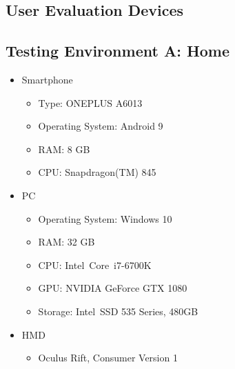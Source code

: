
\begin{appendices}
  \chapter{User Evaluation Devices}\label{chapter:append-user-eval-devices}
  \section{Testing Environment A: Home}
  \begin{itemize}
    \item Smartphone
    \begin{itemize}
      \item Type: ONEPLUS A6013
      \item Operating System: Android 9
      \item RAM: 8 GB
      \item CPU: Snapdragon(TM) 845 %
    \end{itemize}
    \item \ac{PC}
    \begin{itemize}
      \item Operating System: Windows 10
      \item RAM: 32 GB
      \item CPU: Intel\textregistered\ Core\texttrademark\ i7-6700K %
      \item GPU: NVIDIA GeForce GTX 1080
      \item Storage: Intel\textregistered\ SSD 535 Series, 480GB
    \end{itemize}
    \item \ac{HMD}
    \begin{itemize}
      \item Oculus Rift, Consumer Version 1
    \end{itemize}
  \end{itemize}

  \filbreak

\end{appendices}
